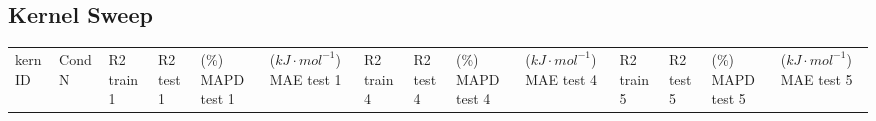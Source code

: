 \documentclass[journal=jacsat,manuscript=article]{achemso}
\begin{document}
\subsection{Kernel Sweep} 
\label{sec:kern_sweep}

\begin{table}[H]
    \centering
    \begin{tabular}{>{\centering\arraybackslash}p{1.0cm}>{\centering\arraybackslash}p{1.0cm}>{\centering\arraybackslash}p{0.75cm}>{\centering\arraybackslash}p{0.75cm}>{\centering\arraybackslash}p{1.0cm}>{\centering\arraybackslash}p{1.0cm}>{\centering\arraybackslash}p{0.75cm}>{\centering\arraybackslash}p{0.75cm}>{\centering\arraybackslash}p{1cm}>{\centering\arraybackslash}p{0.75cm}>{\centering\arraybackslash}p{0.75cm}>{\centering\arraybackslash}p{0.75cm}>{\centering\arraybackslash}p{1cm}>{\centering\arraybackslash}p{0.75cm}}
       \vspace{1.15cm}  kern ID& 
       \vspace{1.15cm} Cond   N& 
       \vspace{0.66cm} R2  train     1&  
 \vspace{0.66cm} R2  test   1& 
 \vspace{0.146cm} (\%) MAPD test \hspace{0.5cm}  1&  
 ($kJ \cdot mol^{-1}$) MAE test  \hspace{0.5cm}   1&  \vspace{0.66cm} R2 train   4& 
 \vspace{0.66cm} R2 test   4& 
 \vspace{0.146cm} (\%) MAPD test  \hspace{0.5cm}  4&  
 ($kJ \cdot mol^{-1}$) MAE test  \hspace{0.5cm}   4& \vspace{0.66cm} R2   train      5& 
 \vspace{0.66cm} R2   test     5& 
 \vspace{0.146cm} (\%) MAPD test  \hspace{0.5cm}   5&
 ($kJ \cdot mol^{-1}$) MAE test  \hspace{0.5cm}   5
 


\end{tabular}
\end{table}
\end{document}
